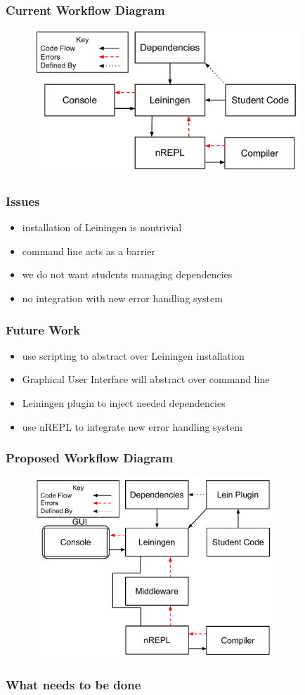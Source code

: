 \documentclass{beamer}
\begin{document}
\begin{frame}[fragile]
\frametitle{Current Workflow Diagram}
\begin{figure}[h]
 \includegraphics[width=10cm]{../CurrentErrorHandling.pdf}
 \centering
\end{figure}
\end{frame}

\begin{frame}
\frametitle{Issues}
	\begin{itemize}
		\item installation of Leiningen is nontrivial
		\item command line acts as a barrier
		\item we do not want students managing dependencies
		\item no integration with new error handling system
	\end{itemize} 
\end{frame}

\begin{frame}
\frametitle{Future Work}
	\begin{itemize}
		\item use scripting to abstract over Leiningen installation
		\item Graphical User Interface will abstract over command line
		\item Leiningen plugin to inject needed dependencies
		\item use nREPL to integrate new error handling system
	\end{itemize}
\end{frame}

\begin{frame}[fragile]
\frametitle{Proposed Workflow Diagram}
\begin{figure}[h]
 \includegraphics[width=9cm]{../OurErrorHandlingSystem.pdf}
 \centering
\end{figure}
\end{frame}

\begin{frame}
\frametitle{What needs to be done}
\end{frame}
\end{document}
